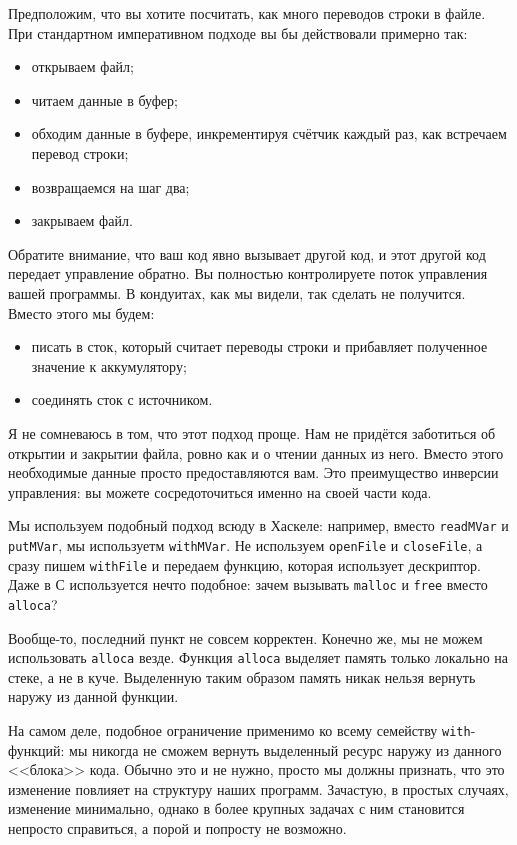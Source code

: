 Предположим, что вы хотите посчитать, как много переводов строки в файле. При 
стандартном императивном подходе вы бы действовали примерно так:
\begin{itemize}  
\item   открываем файл;
\item   читаем данные в буфер;
\item   обходим данные в буфере, инкрементируя счётчик каждый раз, как встречаем перевод строки;
\item   возвращаемся на шаг два;
\item   закрываем файл.
\end{itemize}
Обратите внимание, что ваш код явно вызывает другой код, и этот другой код 
передает управление обратно. Вы полностью контролируете поток 
управления вашей программы. В кондуитах, как мы видели, так сделать 
не получится. Вместо этого мы будем:
\begin{itemize}
\item  писать в сток, который считает переводы строки и прибавляет полученное значение к аккумулятору;
\item  соединять сток с источником.
\end{itemize} 
Я не сомневаюсь в том, что этот подход проще. Нам не придётся заботиться об 
открытии и закрытии файла, ровно как и о чтении данных из него. Вместо этого необходимые данные 
просто предоставляются вам. Это преимущество инверсии управления: вы 
можете сосредоточиться именно на своей части кода.

Мы используем подобный подход всюду в Хаскеле: например, вместо \lstinline'readMVar' 
и \lstinline'putMVar', мы используетм \lstinline'withMVar'. Не используем 
\lstinline'openFile' и \lstinline'closeFile', а сразу пишем \lstinline'withFile' 
и передаем функцию, которая использует дескриптор. Даже в С используется нечто 
подобное: зачем вызывать \lstinline'malloc' и \lstinline'free' вместо
\lstinline'alloca'?

Вообще-то, последний пункт не совсем корректен. Конечно же, мы не можем использовать 
\lstinline'alloca' везде. Функция \lstinline'alloca' выделяет память только локально на 
стеке, а не в куче. Выделенную таким образом память никак нельзя вернуть наружу из 
данной функции.

На самом деле, подобное ограничение применимо ко всему семейству 
\lstinline{with}-функций: мы никогда не сможем вернуть выделенный ресурс наружу из данного 
<<блока>> кода. Обычно это и не нужно, просто мы должны признать, что это 
изменение повлияет на структуру наших программ. Зачастую, в простых случаях, изменение минимально, однако в более крупных задачах с ним становится непросто справиться,
а порой и попросту не возможно. 


